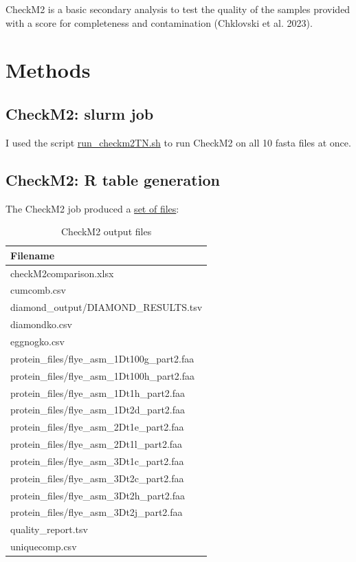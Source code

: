 \documentclass[
  letterpaper,
  DIV=11,
  numbers=noendperiod]{scrreprt}
\begin{document}
CheckM2 is a basic secondary analysis to test the quality of the samples
provided with a score for completeness and contamination (Chklovski et
al. 2023).

\section{Methods}\label{methods-3}

\subsection{CheckM2: slurm job}\label{checkm2-slurm-job}

I used the script
\href{https://github.com/tobiasnunn/tnunn_research/blob/main/Research_Experience_Module/00_scripts/Slurmscripts/run_checkm2TN.sh}{run\_checkm2TN.sh}
to run CheckM2 on all 10 fasta files at once.

\subsection{CheckM2: R table
generation}\label{checkm2-r-table-generation}

The CheckM2 job produced a
\href{https://github.com/tobiasnunn/tnunn_research/tree/main/Research_Experience_Module/02_middle-analysis_outputs/CheckM2_20241228}{set
of files}:

\begin{longtable}[]{@{}l@{}}

\caption{\label{tbl-files}CheckM2 output files}

\tabularnewline

\toprule\noalign{}
Filename \\
\midrule\noalign{}
\endhead
\bottomrule\noalign{}
\endlastfoot
checkM2comparison.xlsx \\
cumcomb.csv \\
diamond\_output/DIAMOND\_RESULTS.tsv \\
diamondko.csv \\
eggnogko.csv \\
protein\_files/flye\_asm\_1Dt100g\_part2.faa \\
protein\_files/flye\_asm\_1Dt100h\_part2.faa \\
protein\_files/flye\_asm\_1Dt1h\_part2.faa \\
protein\_files/flye\_asm\_1Dt2d\_part2.faa \\
protein\_files/flye\_asm\_2Dt1e\_part2.faa \\
protein\_files/flye\_asm\_2Dt1l\_part2.faa \\
protein\_files/flye\_asm\_3Dt1c\_part2.faa \\
protein\_files/flye\_asm\_3Dt2c\_part2.faa \\
protein\_files/flye\_asm\_3Dt2h\_part2.faa \\
protein\_files/flye\_asm\_3Dt2j\_part2.faa \\
quality\_report.tsv \\
uniquecomp.csv \\

\end{longtable}
\end{document}
